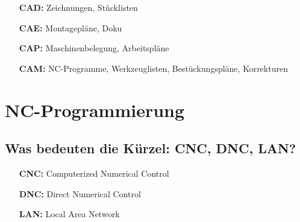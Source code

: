 \begin{itemize}
\item[\textbf{CAD:}] Zeichnungen, Stücklisten
\item[\textbf{CAE:}] Montagepläne, Doku
\item[\textbf{CAP:}] Maschinenbelegung, Arbeitspläne
\item[\textbf{CAM:}] NC-Programme, Werkzeuglisten, Bestückungspläne, Korrekturen
\end{itemize}


\newpage

\section{NC-Programmierung}


\subsection*{Was bedeuten die Kürzel: CNC, DNC, LAN?}

\begin{itemize}
\item[\textbf{CNC:}] Computerized Numerical Control
\item[\textbf{DNC:}] Direct Numerical Control
\item[\textbf{LAN:}] Local Area Network
\end{itemize}




